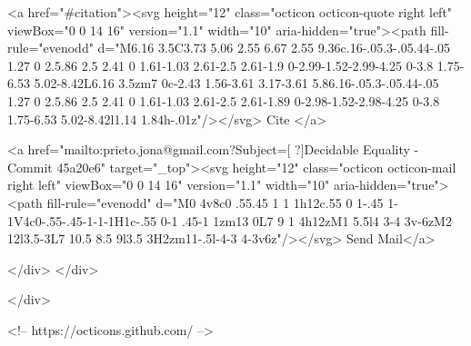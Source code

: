       <a  href="#citation"><svg height="12" class="octicon octicon-quote right left" viewBox="0 0 14 16" version="1.1" width="10" aria-hidden="true"><path fill-rule="evenodd" d="M6.16 3.5C3.73 5.06 2.55 6.67 2.55 9.36c.16-.05.3-.05.44-.05 1.27 0 2.5.86 2.5 2.41 0 1.61-1.03 2.61-2.5 2.61-1.9 0-2.99-1.52-2.99-4.25 0-3.8 1.75-6.53 5.02-8.42L6.16 3.5zm7 0c-2.43 1.56-3.61 3.17-3.61 5.86.16-.05.3-.05.44-.05 1.27 0 2.5.86 2.5 2.41 0 1.61-1.03 2.61-2.5 2.61-1.89 0-2.98-1.52-2.98-4.25 0-3.8 1.75-6.53 5.02-8.42l1.14 1.84h-.01z"/></svg> Cite
      </a>

      <a href="mailto:prieto.jona@gmail.com?Subject=[ ?]Decidable Equality - Commit 45a20e6" target="_top"><svg height="12" class="octicon octicon-mail right left" viewBox="0 0 14 16" version="1.1" width="10" aria-hidden="true"><path fill-rule="evenodd" d="M0 4v8c0 .55.45 1 1 1h12c.55 0 1-.45 1-1V4c0-.55-.45-1-1-1H1c-.55 0-1 .45-1 1zm13 0L7 9 1 4h12zM1 5.5l4 3-4 3v-6zM2 12l3.5-3L7 10.5 8.5 9l3.5 3H2zm11-.5l-4-3 4-3v6z"/></svg> Send Mail</a>

    </div>
  </div>

</div>

<!-- https://octicons.github.com/ -->





